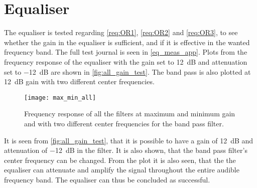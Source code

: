 \section{Equaliser}\label{sec:eq_test}
The equaliser is tested regarding \autoref{req:OR1}, \autoref{req:OR2} and \autoref{req:OR3}, to see whether the gain in the equaliser is sufficient, and if it is effective in the wanted frequency band. The full test journal is seen in \autoref{eq_meas_app}. Plots from the frequency response of the equaliser with the gain set to \SI{12}{\deci\bel} and attenuation set to \SI{-12}{\deci\bel} are shown in \autoref{fig:all_gain_test}. The band pass is also plotted at \SI{12}{\deci\bel} gain with two different center frequencies.

\begin{figure}[httb]
	\centering
	\texttt{[image: max\_min\_all]}
	\caption{Frequency response of all the filters at maximum and minimum gain and with two different center frequencies for the band pass filter.}
	\label{fig:all_gain_test}
\end{figure}

It is seen from \autoref{fig:all_gain_test}, that it is possible to have a gain of \SI{12}{\deci\bel} and attenuation of \SI{-12}{\deci\bel} in the filter. It is also shown, that the band pass filter's center frequency can be changed. From the plot it is also seen, that the the equaliser can attenuate and amplify the signal throughout the entire audible frequency band. The equaliser can thus be concluded as successful. 
